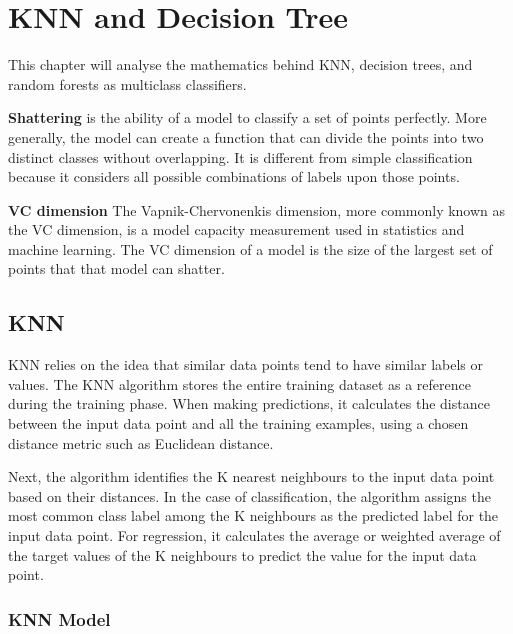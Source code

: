 \chapter{KNN and Decision Tree }
This chapter will analyse the mathematics behind KNN, decision trees, and random forests as multiclass classifiers.
\begin{definition}
\textbf{Shattering} is the ability of a model to classify a set of points perfectly. More generally, the model can create a function that can divide the points into two distinct classes without overlapping. It is different from simple classification because it considers all possible combinations of labels upon those points.
\end{definition}
\begin{definition}\textbf{VC dimension}
    The Vapnik-Chervonenkis dimension, more commonly known as the VC dimension, is a model capacity measurement used in statistics and machine learning. The VC dimension of a model is the size of the largest set of points that that model can shatter.
\end{definition}

\section{KNN} KNN relies on the idea that similar data points tend to have similar labels or values. The KNN algorithm stores the entire training dataset as a reference during the training phase. When making predictions, it calculates the distance between the input data point and all the training examples, using a chosen distance metric such as Euclidean distance.

Next, the algorithm identifies the K nearest neighbours to the input data point based on their distances. In the case of classification, the algorithm assigns the most common class label among the K neighbours as the predicted label for the input data point. For regression, it calculates the average or weighted average of the target values of the K neighbours to predict the value for the input data point.


\subsection{KNN Model}

